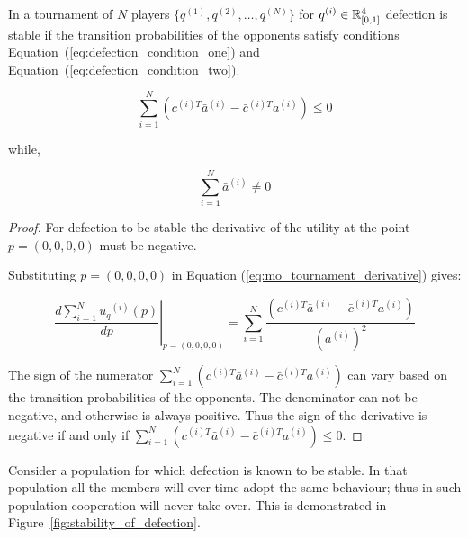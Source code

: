 \begin{lemma}\label{lemma:stability_of_defection}
    In a tournament of \(N\) players \(\{q^{(1)}, q^{(2)}, \dots, q^{(N)} \}\)
    for \(q^{(i)} \in \mathbb{R}_{[0, 1]} ^ 4\)
    defection is stable if the transition probabilities of the
    opponents satisfy conditions Equation~(\ref{eq:defection_condition_one}) and Equation~(\ref{eq:defection_condition_two}).

    \begin{equation}\label{eq:defection_condition_one}
        \sum_{i=1} ^ N (c^{(i)T} \bar{a}^{(i)} - \bar{c}^{(i)T} a^{(i)}) \leq 0
    \end{equation}

    while,

    \begin{equation}\label{eq:defection_condition_two}
        \sum_{i=1} ^ N \bar{a}^{(i)} \neq 0
    \end{equation}
\end{lemma}

\begin{proof}
    For defection to be stable the derivative of the utility
    at the point \(p = (0, 0, 0, 0)\) must be negative.

    Substituting \(p = (0, 0, 0, 0)\) in
    Equation (\ref{eq:mo_tournament_derivative}) gives:

    \begin{equation}
        \left.\frac{d\sum\limits_{i=1} ^ {N} {u_q}^{(i)} (p)}{dp} \right\rvert_{p=(0,0,0,0)} =
    \sum_{i=1} ^ N \frac{(c^{(i)T} \bar{a}^{(i)} - \bar{c}^{(i)T} a^{(i)})}
    {(\bar{a}^{(i)})^2}
    \end{equation}

    The sign of the numerator \( \displaystyle\sum_{i=1} ^ N (c^{(i)T} \bar{a}^{(i)} - \bar{c}^{(i)T} a^{(i)})\)
    can vary based on the transition probabilities of the opponents.
    The denominator can not be negative, and otherwise is always positive.
    Thus the sign of the derivative is negative if and only if
    \( \displaystyle\sum_{i=1} ^ N (c^{(i)T} \bar{a}^{(i)} - \bar{c}^{(i)T} a^{(i)}) \leq 0\).
\end{proof}

Consider a population for which defection is known to be stable. In that
population all the members will over time adopt the same behaviour; thus in such
population cooperation will never take over. This is demonstrated in
Figure~\ref{fig:stability_of_defection}.

